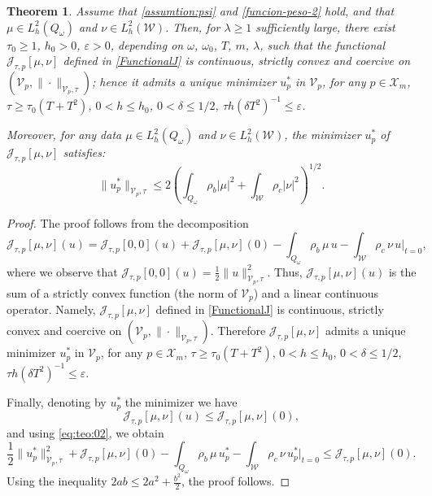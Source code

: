 \documentclass{amsart}
\numberwithin{equation}{section}
\newtheorem{theorem}{Theorem}[section]
\begin{document}
 \begin{theorem}
    Assume that \eqref{assumtion:psi} and \eqref{funcion-peso-2} hold, and that $\mu\in L_{h}^2(Q_\omega)$ and $\nu\in L_{h}^2(\mathcal{W})$. Then, for $\lambda\geq 1$ sufficiently large, there exist $\tau_{0}\geq 1$, $h_{0}>0$, $\varepsilon >0$, depending on $\omega$, $\omega_{0}$, $T$, $m$, $\lambda$, such that the functional $\mathcal{J}_{\tau,p}[\mu,\nu]$ defined in \eqref{FunctionalJ} is continuous, strictly convex and coercive on $(\mathcal{V}_p,\|\cdot\|_{\mathcal{V}_p,\tau})$; hence it admits a unique minimizer $u^\ast_p$ in $\mathcal{V}_p$, for any $p\in \mathcal{X}_{m}$, $\tau\geq \tau_{0}(T+T^{2})$, $0<h\leq h_{0}$, $0<\delta \leq 1/2$, $\tau h(\delta T^{2})^{-1}\leq \varepsilon$.
    
Moreover, for any data $\mu\in L_{h}^{2}(Q_\omega)$ and $\nu\in L_{h}^{2}(\mathcal{W})$, the minimizer $u^\ast_p$ of $\mathcal{J}_{\tau,p}[\mu,\nu]$ satisfies:
$$\|u^\ast_p\|_{\mathcal{V}_p,\tau}\leq 2 \left(\int_{Q_\omega}\rho_b|\mu|^2 +\int_{\mathcal{W}}\rho_c|\nu|^2\right)^{1/2}.$$
 \end{theorem}
 \begin{proof}
     The proof follows from the  decomposition 
     \begin{equation}\label{eq:teo:02}
         \mathcal{J}_{\tau,p}[\mu,\nu](u)=\mathcal{J}_{\tau,p}[0,0](u)+\mathcal{J}_{\tau,p}[\mu,\nu](0)-\int_{Q_\omega}\rho_b\,\mu\,u -\int_{\mathcal{W}}\rho_c\,\nu\,u|_{t=0},
     \end{equation}
     where we observe that $\mathcal{J}_{\tau,p}[0,0](u)=\frac{1}{2}\|u\|^2_{\mathcal{V}_p,\tau}$. Thus,  $\mathcal{J}_{\tau,p}[\mu,\nu](u)$ is the sum of a strictly convex function (the norm of $\mathcal{V}_p$) and a linear continuous operator. Namely, $\mathcal{J}_{\tau,p}[\mu,\nu]$ defined in \eqref{FunctionalJ} is continuous, strictly convex and coercive on $(\mathcal{V}_p,\|\cdot\|_{\mathcal{V}_p,\tau})$. Therefore $\mathcal{J}_{\tau,p}[\mu,\nu]$ admits a unique minimizer $u^\ast_p$ in $\mathcal{V}_p$, for any $p\in \mathcal{X}_{m}$, $\tau\geq \tau_{0}(T+T^{2})$, $0<h\leq h_{0}$, $0<\delta \leq 1/2$, $\tau h(\delta T^{2})^{-1}\leq \varepsilon$.
     
     Finally, denoting by $u^\ast_{p}$ the minimizer we have 
     $$\mathcal{J}_{\tau,p}[\mu,\nu](u)\leq \mathcal{J}_{\tau,p}[\mu,\nu](0),$$
     and using \eqref{eq:teo:02}, we obtain 
     $$\frac{1}{2}\|u^\ast_p\|^2_{\mathcal{V}_p,\tau}+\mathcal{J}_{\tau,p}[\mu,\nu](0)-\int_{Q_\omega}\rho_b\,\mu\,u^\ast_p -\int_{\mathcal{W}}\rho_c\,\nu\,u^\ast_p|_{t=0}\leq \mathcal{J}_{\tau,p}[\mu,\nu](0).$$
     Using the inequality $2ab\leq 2a^2+\frac{b^2}{2}$, the proof follows.
 \end{proof}
\end{document}
